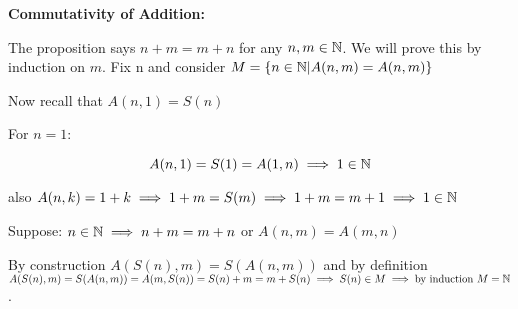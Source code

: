 \textbf{Commutativity of Addition:}
\vspace{\baselineskip}

The proposition says \(n + m = m + n\) for any \(n, m \in \mathbb{N}\). We will prove this by induction on \(m\).
Fix n and consider \(M = \{ n \in \mathbb{N} | A(n, m) = A(n, m)\}\)

Now recall that \(A(n, 1) = S(n)\)
\vspace{\baselineskip}

For \(n = 1\):

\[
	A(n, 1) = S(1) = A(1, n) \implies 1 \in \mathbb{N}
\]

also \(A(n , k) = 1 + k \implies 1 + m = S(m) \implies 1 + m = m + 1 \implies 1 \in \mathbb{N}\)

Suppose: \(n \in \mathbb{N} \implies n + m = m + n\) or \(A(n, m) = A(m, n)\)

By construction \(A(S(n), m) = S(A(n, m))\) and by definition
\(A(S(n), m) = S(A(n, m)) = A(m, S(n)) = S(n) + m =  m + S(n) \implies S(n) \in M \implies \text{by induction } M = \mathbb{N}\).
